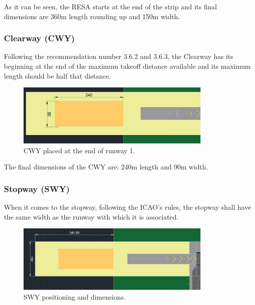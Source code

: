 			As it can be seen, the RESA starts at the end of the strip and its final dimensions are 360m length rounding up and 150m width. 
			
			\subsubsection{Clearway (CWY)}
			Following the recommendation number 3.6.2 and 3.6.3, the Clearway has its beginning at the end of the maximum takeoff distance available and its maximum length should be half that distance.
			
			\begin{figure}[H]
				\centering
				\includegraphics[clip, trim=0cm 0cm 0cm 0cm, width=0.85\textwidth]{./images/declareddistances/CWY}
				\caption{CWY placed at the end of runway 1.} %
				\label{} %
			\end{figure}
			
			The final dimensions of the CWY are: 240m length and 90m width. 
			
			\subsubsection{Stopway (SWY)}
			When it comes to the stopway, following the ICAO's rules, the stopway shall have the same width as the runway with which it is associated.

			\begin{figure}[H]
				\centering
				\includegraphics[clip, trim=0cm 0cm 0cm 0cm, width=0.85\textwidth]{./images/declareddistances/SWY}
				\caption{SWY positioning and dimensions.} %
				\label{} %
			\end{figure}
		
